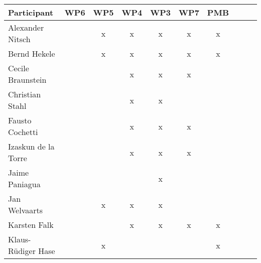 \documentclass[a4paper, 11pt]{article}
\begin{document}
\begin{tabular}{|l|c|c|c||c|c|c||c|c|c|}
\hline
\textbf{Participant} & \textbf{WP6} &  \textbf{WP5} & \textbf{WP4}&  \textbf{WP3} & \textbf{WP7}&  \textbf{PMB} \\\hline
Alexander Nitsch     &   & x & x & x & x & x \\\hline  
Bernd Hekele         &   & x & x & x & x & x \\\hline
Cecile Braunstein    &   &   & x & x & x &   \\\hline
Christian Stahl      &   &   & x & x &   &   \\\hline
Fausto Cochetti      &   &   & x & x & x &   \\\hline
Izaskun de la Torre  &   &   & x & x & x &   \\\hline
Jaime Paniagua       &   &   &   & x &   &   \\\hline
Jan Welvaarts        &   & x & x & x &   &   \\\hline
Karsten Falk         &   &   & x & x & x & x \\\hline
Klaus-R\"udiger Hase &  & x &   &   &   & x \\\hline

\end{tabular}
\end{document}
